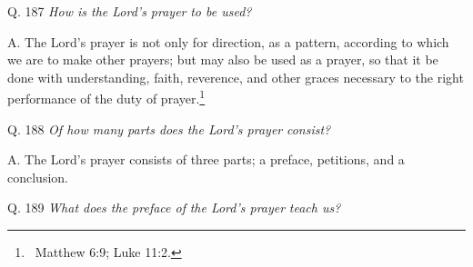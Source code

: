{{{{{{{{{{{{{{{\bigskip

Q. 187 \textit{How is the Lord's prayer}\textit{ to be used?}

A. The Lord's prayer is not only for
direction, as a pattern, according to which we are to make other prayers; but may
also be used as a prayer, so that it be done with understanding,
faith, reverence, and other graces necessary to the right performance of the
duty of prayer.\footnote{\ Matthew 6:9; Luke
11:2.}


\bigskip

Q. 188 \textit{Of how many parts does the Lord's prayer}\textit{
consist?}

A. The Lord's prayer consists of three parts; a
preface, petitions, and a
conclusion.


\bigskip

Q. 189 \textit{What does the preface of}\textit{ the Lord's
prayer}\textit{ teach us?}

}}}}}}}}}}}}}}}
